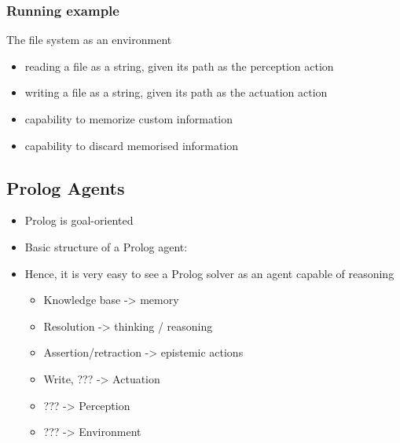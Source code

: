 \hypertarget{running-example}{%
\subsubsection{Running example}\label{running-example}}

The file system as an environment

\begin{itemize}
\item
  reading a file as a string, given its path as the perception action
\item
  writing a file as a string, given its path as the actuation action
\item
  capability to memorize custom information
\item
  capability to discard memorised information
\end{itemize}

\hypertarget{prolog-agents}{%
\subsection{Prolog Agents}\label{prolog-agents}}

\begin{itemize}
\item
  Prolog is goal-oriented
\item
  Basic structure of a Prolog agent:

\begin{Shaded}
\begin{Highlighting}[]
\NormalTok{) }\KeywordTok{:{-}} 
\NormalTok{)}\KeywordTok{,}
 \NormalTok{ )}\KeywordTok{,} 
\NormalTok{)}

\NormalTok{) }\KeywordTok{:{-}} \NormalTok{(}\StringTok{\textquotesingle{}}\StringTok{\textquotesingle{}}\NormalTok{)}\KeywordTok{,} \NormalTok{(}\NormalTok{)}\KeywordTok{,} 
\end{Highlighting}
\end{Shaded}
\item
  Hence, it is very easy to see a Prolog solver as an agent capable of
  reasoning

  \begin{itemize}
  \tightlist
  \item
    Knowledge base -\textgreater{} memory
  \item
    Resolution -\textgreater{} thinking / reasoning
  \item
    Assertion/retraction -\textgreater{} epistemic actions
  \item
    Write, ??? -\textgreater{} Actuation
  \item
    ??? -\textgreater{} Perception
  \item
    ??? -\textgreater{} Environment
  \end{itemize}
\end{itemize}

